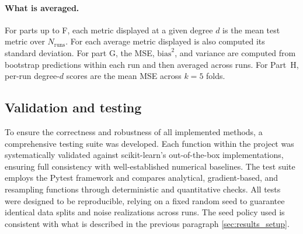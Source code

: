 \documentclass[
 reprint,            %
 amsmath,amssymb,
 aps,
]{revtex4-2}
\begin{document}
\paragraph*{What is averaged.}
For parts up to F, each metric displayed at a given degree $d$ is the mean test metric over $N_{\text{runs}}$. For each average metric displayed is also computed its standard deviation. For part G, the MSE, $\mathrm{bias}^2$, and variance are computed from bootstrap predictions within each run and then averaged across runs. For Part~H, per-run degree-$d$ scores are the mean MSE across $k=5$ folds.




\subsection*{Validation and testing}
\label{Validation_and_Testing}

To ensure the correctness and robustness of all implemented methods, a comprehensive testing suite was developed. 
Each function within the project was systematically validated against scikit-learn's out-of-the-box implementations, 
ensuring full consistency with well-established numerical baselines. 
The test suite employs the Pytest framework and compares analytical, gradient-based, and resampling functions through deterministic and quantitative checks. 
All tests were designed to be reproducible, relying on a fixed random seed to guarantee identical data splits and noise realizations across runs. 
The seed policy used is consistent with what is described in the previous paragraph \ref{sec:results_setup}.
\end{document}
